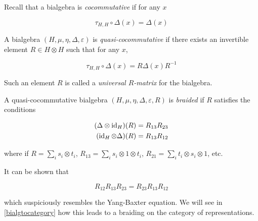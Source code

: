 Recall that a bialgebra is \emph{cocommutative} if for any $x$

\begin{equation}
    \tau_{H,H}\circ \Delta(x)  = \Delta(x)
\end{equation}

\begin{defn}
    A bialgebra $(H,\mu,\eta, \Delta, \varepsilon)$ is
    \emph{quasi-cocommutative} if there exists an invertible element $R \in H
    \otimes H$ such that for any $x$,

    \begin{equation}
        \tau_{H,H}\circ \Delta(x)  = R \Delta(x) R^{-1}
    \end{equation}
\end{defn}

Such an element $R$ is called a \emph{universal $R$-matrix} for the bialgebra. 

\begin{defn}
    A quasi-cocommutative bialgebra $(H,\mu,\eta, \Delta, \varepsilon, R)$ is \emph{braided} if $R$ satisfies the conditions

    \begin{align}
        (\Delta \otimes \operatorname{id}_H)(R) = R_{13} R_{23} \\
        (\operatorname{id}_H \otimes \Delta)(R) = R_{13} R_{12} 
    \end{align}

    where if $R = \displaystyle\sum_i s_i \otimes t_i$, $R_{13} = \sum_{i} s_i
    \otimes 1 \otimes t_i$, $R_{21} = \sum_{i} t_i \otimes s_i \otimes 1$, etc.

\end{defn}

It can be shown that 

\begin{equation}
    R_{12} R_{13} R_{23} = R_{23} R_{13} R_{12}
\end{equation}

which suspiciously resembles the Yang-Baxter equation. We will see in
\ref{bialgtocategory} how this leads to a braiding on the category of
representations.
